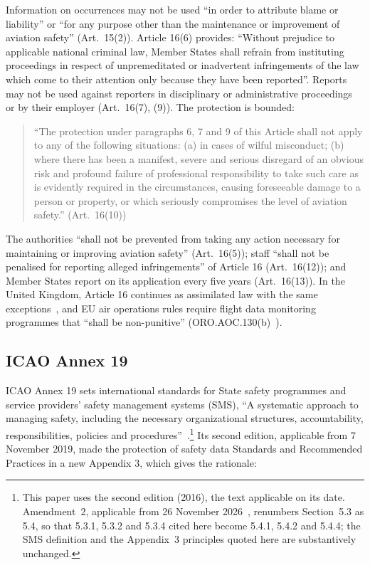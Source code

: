 \documentclass[review,12pt]{elsarticle}
\begin{document}
Information on occurrences may not be used ``in order to attribute blame or liability'' or ``for any purpose other than the maintenance or improvement of aviation safety'' (Art.~15(2)). Article 16(6) provides: ``Without prejudice to applicable national criminal law, Member States shall refrain from instituting proceedings in respect of unpremeditated or inadvertent infringements of the law which come to their attention only because they have been reported''. Reports may not be used against reporters in disciplinary or administrative proceedings or by their employer (Art.~16(7), (9)). The protection is bounded:

\begin{quote}
``The protection under paragraphs 6, 7 and 9 of this Article shall not apply to any of the following situations: (a) in cases of wilful misconduct; (b) where there has been a manifest, severe and serious disregard of an obvious risk and profound failure of professional responsibility to take such care as is evidently required in the circumstances, causing foreseeable damage to a person or property, or which seriously compromises the level of aviation safety.'' (Art.~16(10))
\end{quote}

The authorities ``shall not be prevented from taking any action necessary for maintaining or improving aviation safety'' (Art.~16(5)); staff ``shall not be penalised for reporting alleged infringements'' of Article 16 (Art.~16(12)); and Member States report on its application every five years (Art.~16(13)). In the United Kingdom, Article 16 continues as assimilated law with the same exceptions~\cite{uk376}, and EU air operations rules require flight data monitoring programmes that ``shall be non-punitive'' (ORO.AOC.130(b)~\cite{eu965}).

\subsection{ICAO Annex 19}\label{sec:icao}

ICAO Annex 19 sets international standards for State safety programmes and service providers' safety management systems (SMS), ``A systematic approach to managing safety, including the necessary organizational structures, accountability, responsibilities, policies and procedures''~\cite[Chapter~1]{icao2016}.\footnote{This paper uses the second edition (2016), the text applicable on its date. Amendment~2, applicable from 26 November 2026~\cite{icao2025}, renumbers Section~5.3 as 5.4, so that 5.3.1, 5.3.2 and 5.3.4 cited here become 5.4.1, 5.4.2 and 5.4.4; the SMS definition and the Appendix~3 principles quoted here are substantively unchanged.} Its second edition, applicable from 7 November 2019, made the protection of safety data Standards and Recommended Practices in a new Appendix 3, which gives the rationale:
\end{document}
